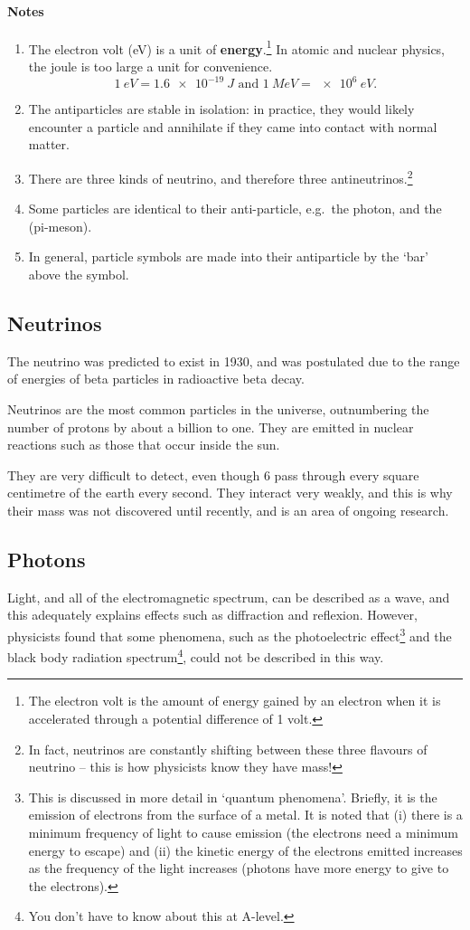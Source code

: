 \paragraph{Notes}\begin{enumerate}
\item The electron volt (eV) is a unit of {\bf energy}.\footnote{The electron volt is the amount of energy gained by an electron when it is accelerated through a potential difference of 1 volt.}  In atomic and nuclear physics, the joule is too large a unit for convenience.
\[\SI{1}{eV}=\SI{1.6e-19}{J}\text{ and }\SI{1}{MeV}=\SI{e6}{eV}.\]
\item The antiparticles are stable in isolation: in practice, they would likely encounter a particle and annihilate if they came into contact with normal matter.
\item There are three kinds of neutrino, and therefore three antineutrinos.\footnote{In fact, neutrinos are constantly shifting between these three flavours of neutrino -- this is how physicists know they have mass!}
\item Some particles are identical to their anti-particle, e.g.\ the photon, and the \Ppizero (pi-meson).
\item In general, particle symbols are made into their antiparticle by the `bar' above the symbol.
\end{enumerate}

\subsection{Neutrinos}
The neutrino was predicted to exist in 1930, and was postulated due to the range of energies of beta particles in radioactive beta decay.

Neutrinos are the most common particles in the universe, outnumbering the number of protons by about a billion to one.  They are emitted in nuclear reactions such as those that occur inside the sun.

They are very difficult to detect, even though 6 pass through every square centimetre of the earth every second.  They interact very weakly, and this is why their mass was not discovered until recently, and is an area of ongoing research.

\subsection{Photons}

Light, and all of the electromagnetic spectrum, can be described as a wave, and this adequately explains effects such as diffraction and reflexion.  However, physicists found that some phenomena, such as the photoelectric effect\footnote{This is discussed in more detail in `quantum phenomena'.  Briefly, it is the emission of electrons from the surface of a metal.  It is noted that (i) there is a minimum frequency of light to cause emission (the electrons need a minimum energy to escape) and (ii) the kinetic energy of the electrons emitted increases as the frequency of the light increases (photons have more energy to give to the electrons).} and the black body radiation spectrum\footnote{You don't have to know about this at A-level.}, could not be described in this way.

